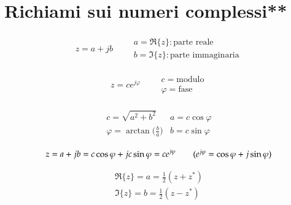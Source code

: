 \chapter{Richiami sui numeri complessi**}
\label{cha:numeri-complessi}


\begin{align*}
z=a+jb\qquad \begin{array}{l}
a=\Re{\{z\}}:\text{parte reale}\\
b=\Im{\{z\}}:\text{parte immaginaria}
\end{array}\end{align*}

\begin{align*}
z=ce^{j\varphi}\qquad\begin{array}{l}
c=\text{modulo}\\
\varphi=\text{fase}
\end{array}\end{align*}

\begin{center}\end{center}

\begin{align*}\begin{array}{ll}
c=\sqrt{a^2+b^2} & a=c\cos\varphi\\
\varphi=\arctan\biggl(\frac{b}{a}\biggr) & b=c\sin\varphi
\end{array}\end{align*}

\begin{align*}
z=a+jb=c\cos\varphi +jc\sin\varphi=ce^{j\varphi}  \tag{$e^{j\varphi}=\cos\varphi+j\sin\varphi$}
\end{align*}

\begin{align*}
\Re{\{z\}}=a=\frac{1}{2}(z+z^*)\\
\Im{\{z\}}=b=\frac{1}{2}(z-z^*)
\end{align*}

